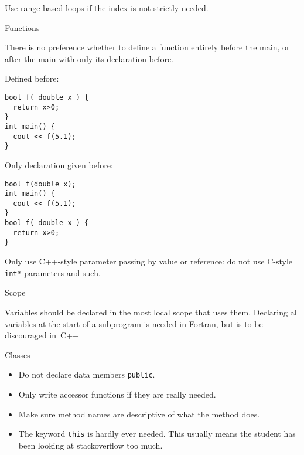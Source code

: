 Use range-based loops if the index is not strictly needed.

 {Functions}

There is no preference whether to define a function entirely before the main,
or after the main with only its declaration before.

\begin{multicols}{2}
Defined before:
\begin{lstlisting}
bool f( double x ) { 
  return x>0;
}
int main() {
  cout << f(5.1);
}
\end{lstlisting}
\columnbreak
Only declaration given before:
\begin{lstlisting}
bool f(double x);
int main() {
  cout << f(5.1);
}
bool f( double x ) { 
  return x>0;
}
\end{lstlisting}
\end{multicols}

Only use C++-style parameter passing by value or reference:
do not use C-style \lstinline+int*+ parameters and such.

 {Scope}

Variables should be declared in the most local scope that uses them.
Declaring all variables at the start of a subprogram is needed in Fortran,
but is to be discouraged in~C++

\begin{comment}
\Level 1 {Structures}

Do not declare a single global structure:
\begin{multicols}{2}
Good:
\begin{lstlisting}
struct Point { double x,y; } ;
int main() {
  Point mypoint;
  cin >> mypoint.x;
\end{lstlisting}
\columnbreak
Not good:
\begin{lstlisting}
struct Point { double x,y; } mypoint;
int main() {
  cin >> mypoint.x;
\end{lstlisting}
\end{multicols}
\end{comment}

 {Classes}

\begin{itemize}
\item Do not declare data members \lstinline{public}.
\item Only write accessor functions if they are really needed.
\item Make sure method names are descriptive of what the method does.
\item The keyword \lstinline{this} is hardly ever needed.
  This usually means the student has been looking at stackoverflow too much.
\end{itemize}

